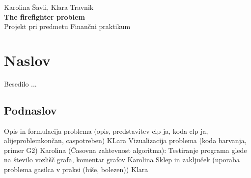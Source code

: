 \documentclass[a4paper, 12pt]{article}
\begin{document}
    
\thispagestyle{empty}
\vfill

\begin{center}{\large
Karolina Šavli, Klara Travnik\\[5mm]
{\Huge \bf The firefighter problem}\\[5mm]
Projekt pri predmetu Finančni praktikum\\[1cm]}
\end{center}
\vfill

\pagebreak


\tableofcontents

\pagebreak



\section{Naslov}
Besedilo ...

\subsection{Podnaslov}
Opis in formulacija problema (opis, predstavitev clp-ja, koda clp-ja, alijeproblemkončan, caspotreben) KLara
Vizualizacija problema (koda barvanja, primer G2) Karolina
(Časovna zahtevnost algoritma): 
Testiranje programa glede na število vozlišč grafa, komentar grafov Karolina
Sklep in zaključek (uporaba problema gasilca v praksi (hiše, bolezen)) Klara

\pagebreak





% 
% 

\end{document}
